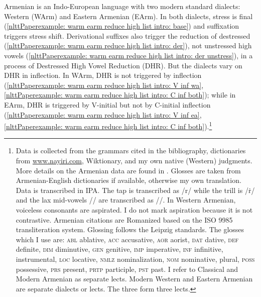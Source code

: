 Armenian is an Indo-European language with two modern standard dialects: Western (WArm) and Eastern Armenian (EArm). In both dialects, stress is final (\ref{nlttPaperexample: warm earm reduce high list intro: base}) and suffixation triggers stress shift. Derivational suffixes also trigger the reduction of {destressed} (\ref{nlttPaperexample: warm earm reduce high list intro: der}), not {unstressed} high vowels (\ref{nlttPaperexample: warm earm reduce high list intro: der unstress}), in a process of Destressed High Vowel Reduction (DHR). But the dialects vary on DHR in inflection. In WArm, DHR is not triggered by inflection (\ref{nlttPaperexample: warm earm reduce high list intro: V inf wa},\ref{nlttPaperexample: warm earm reduce high list intro: C inf both}); while in EArm, DHR is triggered by V-initial but not by C-initial inflection (\ref{nlttPaperexample: warm earm reduce high list intro: V inf ea},\ref{nlttPaperexample: warm earm reduce high list intro: C inf both}).\footnote{
	Data is collected from the grammars cited in the bibliography, dictionaries from \url{www.nayiri.com}, Wiktionary, and my own native (Western) judgments. More details on the Armenian data are found in \citet{Dolatian-2020-Diss}. Glosses are taken from Armenian-English dictionaries if available, otherwise my own translation. Data is transcribed in IPA. The tap is transcribed as /r/ while the trill is /\.{r}/ and the lax mid-vowels // are transcribed as //. In Western Armenian, voiceless consonants are aspirated. I do not mark aspiration because it is not contrastive. Armenian citations are Romanized based on the ISO 9985 transliteration system. Glossing follows the Leipzig standards. The glosses which I use are: \textsc{abl} ablative, \textsc{acc} accusative, \textsc{aor} aorist, \textsc{dat} dative, \textsc{def} definite, \textsc{dim} diminutive, \textsc{gen} genitive, \textsc{imp} imperative, \textsc{inf} infinitive, {\ins} instrumental, \textsc{loc} locative, \textsc{nmlz} nominalization, \textsc{nom} nominative, {\pl} plural, \textsc{poss} possessive, \textsc{prs} present, \textsc{prtp} participle, \textsc{pst} past. I refer to Classical and Modern Armenian as separate lects. Modern Western and Eastern Armenian are separate dialects or lects. The three form three lects.
	
} 


